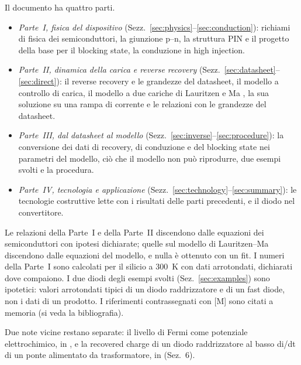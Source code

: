 \documentclass[10pt,a4paper]{scrartcl}
\begin{document}
Il documento ha quattro parti.
\begin{itemize}
\item \emph{Parte~I, fisica del dispositivo} (Sezz.~\ref{sec:physics}--\ref{sec:conduction}): richiami di fisica dei semiconduttori, la giunzione p--n, la struttura PIN e il progetto della base per il blocking state, la conduzione in high injection.
\item \emph{Parte~II, dinamica della carica e reverse recovery} (Sezz.~\ref{sec:datasheet}--\ref{sec:direct}): il reverse recovery e le grandezze del datasheet, il modello a controllo di carica, il modello a due cariche di Lauritzen e Ma \cite{lauritzen1991}, la sua soluzione su una rampa di corrente e le relazioni con le grandezze del datasheet.
\item \emph{Parte~III, dal datasheet al modello} (Sezz.~\ref{sec:inverse}--\ref{sec:procedure}): la conversione dei dati di recovery, di conduzione e del blocking state nei parametri del modello, ciò che il modello non può riprodurre, due esempi svolti e la procedura.
\item \emph{Parte~IV, tecnologia e applicazione} (Sezz.~\ref{sec:technology}--\ref{sec:summary}): le tecnologie costruttive lette con i risultati delle parti precedenti, e il diodo nel convertitore.
\end{itemize}
Le relazioni della Parte~I e della Parte~II discendono dalle equazioni dei semiconduttori con ipotesi dichiarate; quelle sul modello di Lauritzen--Ma discendono dalle equazioni del modello, e nulla è ottenuto con un fit. I numeri della Parte~I sono calcolati per il silicio a \SI{300}{\kelvin} con dati arrotondati, dichiarati dove compaiono. I due diodi degli esempi svolti (Sez.~\ref{sec:examples}) sono ipotetici: valori arrotondati tipici di un diodo raddrizzatore e di un fast diode, non i dati di un prodotto. I riferimenti contrassegnati con [M] sono citati a memoria (si veda la bibliografia).

Due note vicine restano separate: il livello di Fermi come potenziale elettrochimico, in , e la recovered charge di un diodo raddrizzatore al basso di/dt di un ponte alimentato da trasformatore, in  (Sez.~6).
\end{document}
